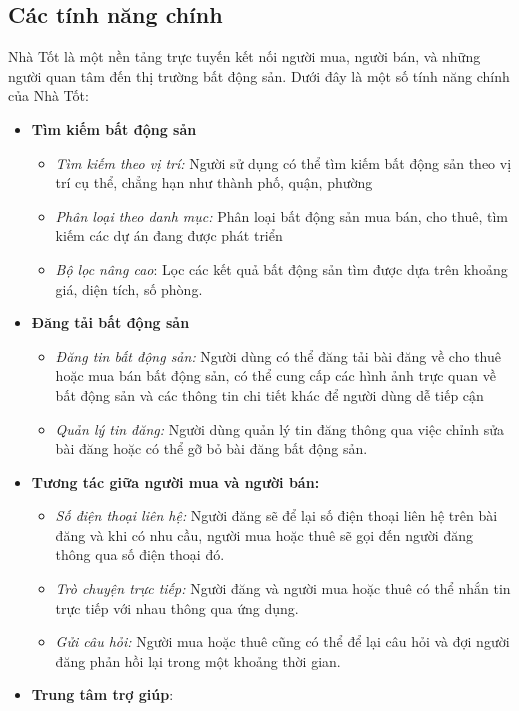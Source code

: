 \subsection{Các tính năng chính}
Nhà Tốt là một nền tảng trực tuyến kết nối người mua, người bán, và những người quan tâm đến thị trường bất động sản. Dưới đây là một số tính năng chính của Nhà Tốt:
\begin{itemize}
    \item \textbf{Tìm kiếm bất động sản}
    \begin{itemize}
        \item \textit{Tìm kiếm theo vị trí:} Người sử dụng có thể tìm kiếm bất động sản theo vị trí cụ thể, chẳng hạn như thành phố, quận, phường
        \item \textit{Phân loại theo danh mục:} Phân loại bất động sản mua bán, cho thuê, tìm kiếm các dự án đang được phát triển
        \item \textit{Bộ lọc nâng cao}: Lọc các kết quả bất động sản tìm được dựa trên khoảng giá, diện tích, số phòng.
    \end{itemize}
    \item \textbf{Đăng tải bất động sản}
    \begin{itemize}
        \item \textit{Đăng tin bất động sản:} Người dùng có thể đăng tải bài đăng về cho thuê hoặc mua bán bất động sản, có thể cung cấp các hình ảnh trực quan về bất động sản và các thông tin chi tiết khác để người dùng dễ tiếp cận
        \item \textit{Quản lý tin đăng:} Người dùng quản lý tin đăng thông qua việc chỉnh sửa bài đăng hoặc có thể gỡ bỏ bài đăng bất động sản.
    \end{itemize}
    \item \textbf{Tương tác giữa người mua và người bán:}
    \begin{itemize}
        \item \textit{Số điện thoại liên hệ:} Người đăng sẽ để lại số điện thoại liên hệ trên bài đăng và khi có nhu cầu, người mua hoặc thuê sẽ gọi đến người đăng thông qua số điện thoại đó.
        \item \textit{Trò chuyện trực tiếp:} Người đăng và người mua hoặc thuê có thể nhắn tin trực tiếp với nhau thông qua ứng dụng.
        \item \textit{Gửi câu hỏi:} Người mua hoặc thuê cũng có thể để lại câu hỏi và đợi người đăng phản hồi lại trong một khoảng thời gian.
    \end{itemize}
    \item \textbf{Trung tâm trợ giúp}:

\end{itemize}
